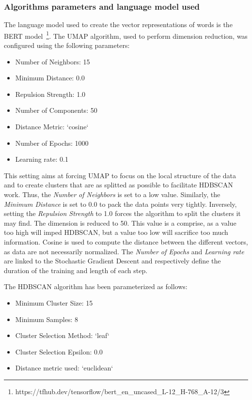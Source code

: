 \subsubsection{Algorithms parameters and language model used}
The language model used to create the vector representations of words is the BERT
model~\footnote{https://tfhub.dev/tensorflow/bert\_en\_uncased\_L-12\_H-768\_A-12/3}.
The UMAP algorithm, used to perform dimension reduction, was configured using the following parameters:

\begin{itemize}
    \item Number of Neighbors: 15
    \item Minimum Distance: 0.0
    \item Repulsion Strength: 1.0
    \item Number of Components: 50
    \item Distance Metric: `cosine`
    \item Number of Epochs: 1000
    \item Learning rate: 0.1
\end{itemize}

This setting aims at forcing UMAP to focus on the local structure of the data and to create
clusters that are as splitted as possible to facilitate HDBSCAN work.
Thus, the \textit{Number of Neighbors} is set to a low value.
Similarly, the \textit{Minimum Distance} is set to 0.0 to pack the data points very tightly.
Inversely, setting the \textit{Repulsion Strength} to 1.0 forces the algorithm to split
the clusters it may find.
The dimension is reduced to 50.
This value is a comprise, as a value too high will imped HDBSCAN, but a value too low will
sacrifice too much information.
Cosine is used to compute the distance between the different vectors, as data are not necessarily
normalized.
The \textit{Number of Epochs} and \textit{Learning rate} are linked to the Stochastic
Gradient Descent and respectively define the duration of the training and length of
each step.

The HDBSCAN algorithm has been parameterized as follows:

\begin{itemize}
    \item Minimum Cluster Size: 15
    \item Minimum Samples: 8
    \item Cluster Selection Method: `leaf`
    \item Cluster Selection Epsilon: 0.0
    \item Distance metric used: `euclidean`
\end{itemize}

